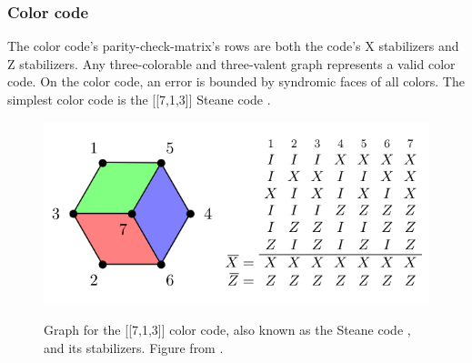 \subsubsection{Color code}
The color code's parity-check-matrix's 
rows are both the code's X stabilizers and Z stabilizers.
Any three-colorable and three-valent graph represents a valid color code.
On the color code, an error is bounded by syndromic faces of all colors.
The simplest color code is the [[7,1,3]] Steane code \cite{steane}. 
\\
\begin{figure}[h!]
	\begin{center}
	\captionsetup{justification=centering,margin=2cm}
	\includegraphics[scale=0.6]{./img/figures/steane.png}\\
	\caption{Graph for the [[7,1,3]] color code, also known as the
    Steane code , and its stabilizers. 
    Figure from \cite{steane}.}
        
	\label{fig: color_graph}
	\end{center}
\end{figure}

